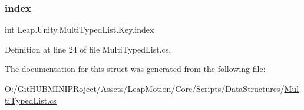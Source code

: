 \subsubsection{\texorpdfstring{index}{index}}
{\footnotesize\ttfamily int Leap.\+Unity.\+Multi\+Typed\+List.\+Key.\+index}



Definition at line 24 of file Multi\+Typed\+List.\+cs.



The documentation for this struct was generated from the following file\+:\begin{DoxyCompactItemize}
\item 
O\+:/\+Git\+H\+U\+B\+M\+I\+N\+I\+P\+Roject/\+Assets/\+Leap\+Motion/\+Core/\+Scripts/\+Data\+Structures/\mbox{\hyperlink{_multi_typed_list_8cs}{Multi\+Typed\+List.\+cs}}\end{DoxyCompactItemize}
